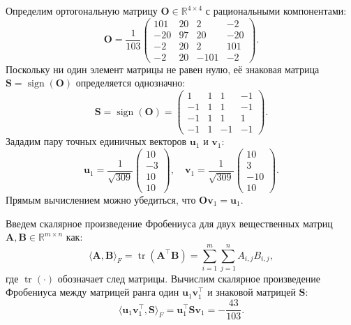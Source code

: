 \documentclass{article}
\begin{document}
Определим ортогональную матрицу $\mathbf{O} \in \mathbb{R}^{4 \times 4}$ с рациональными компонентами:
\begin{equation}
\mathbf{O} = \frac{1}{103} \begin{pmatrix} 101 & 20 & 2 & -2 \\ -20 & 97 & 20 & -20 \\ -2 & 20 & 2 & 101 \\ -2 & 20 & -101 & -2 \end{pmatrix}.
\end{equation}
Поскольку ни один элемент матрицы не равен нулю, её знаковая матрица $\mathbf{S} = \operatorname{sign}(\mathbf{O})$ определяется однозначно:
\begin{equation}
\mathbf{S} = \operatorname{sign}(\mathbf{O}) = \begin{pmatrix} 1 & 1 & 1 & -1 \\ -1 & 1 & 1 & -1 \\ -1 & 1 & 1 & 1 \\ -1 & 1 & -1 & -1 \end{pmatrix}.
\end{equation}
Зададим пару точных единичных векторов $\mathbf{u}_1$ и $\mathbf{v}_1$:
\begin{equation}
\mathbf{u}_1 = \frac{1}{\sqrt{309}} \begin{pmatrix} 10 \\ -3 \\ 10 \\ 10 \end{pmatrix}, \quad \mathbf{v}_1 = \frac{1}{\sqrt{309}} \begin{pmatrix} 10 \\ 3 \\ -10 \\ 10 \end{pmatrix}.
\end{equation}
Прямым вычислением можно убедиться, что $\mathbf{O} \mathbf{v}_1 = \mathbf{u}_1$. 

Введем скалярное произведение Фробениуса для двух вещественных матриц $\mathbf{A}, \mathbf{B} \in \mathbb{R}^{m \times n}$ как:
\begin{equation}
    \langle \mathbf{A}, \mathbf{B} \rangle_F = \operatorname{tr}(\mathbf{A}^\top \mathbf{B}) = \sum_{i=1}^m \sum_{j=1}^n A_{i,j} B_{i,j},
\end{equation}
где $\operatorname{tr}(\cdot)$ обозначает след матрицы. 
Вычислим скалярное произведение Фробениуса между матрицей ранга один $\mathbf{u}_1 \mathbf{v}_1^\top$ и знаковой матрицей $\mathbf{S}$:
\begin{equation}
\langle \mathbf{u}_1 \mathbf{v}_1^\top, \mathbf{S} \rangle_F = \mathbf{u}_1^\top \mathbf{S} \mathbf{v}_1 = -\frac{43}{103}.
\end{equation}
\end{document}
